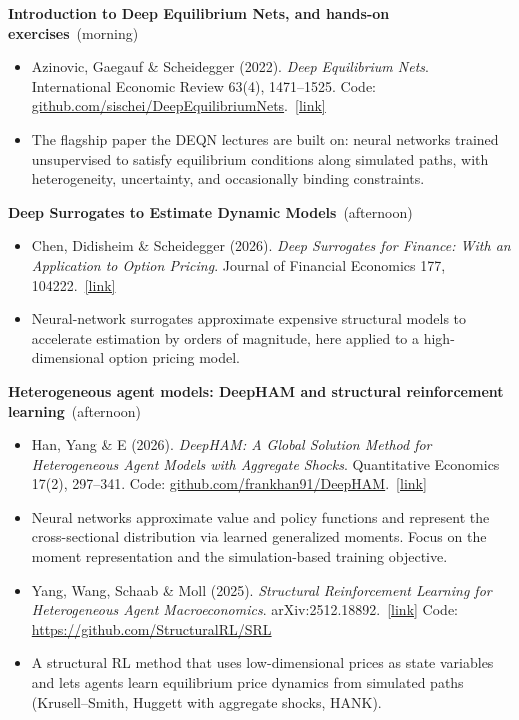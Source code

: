 \documentclass[11pt]{article}
\newcommand{\reading}[5]{%
  \item #1. \textit{#2}. #3.\ \href{#4}{[link]}%
}
\newcommand{\session}[2]{\smallskip\noindent\textbf{\color{accent}#1}\ {\small\color{notegray}(#2)}\par\nopagebreak\smallskip}
\begin{document}
\session{Introduction to Deep Equilibrium Nets, and hands-on exercises}{morning}

\begin{itemize}
  \reading{Azinovic, Gaegauf \& Scheidegger (2022)}{Deep Equilibrium Nets}{International Economic Review 63(4), 1471--1525. Code: \href{https://github.com/sischei/DeepEquilibriumNets}{github.com/\allowbreak sischei/\allowbreak DeepEquilibriumNets}}{https://doi.org/10.1111/iere.12575}{}
  \item[] {\small\color{notegray}The flagship paper the DEQN lectures are built on: neural networks trained unsupervised to satisfy equilibrium conditions along simulated paths, with heterogeneity, uncertainty, and occasionally binding constraints.}
\end{itemize}

\session{Deep Surrogates to Estimate Dynamic Models}{afternoon}

\begin{itemize}
  \reading{Chen, Didisheim \& Scheidegger (2026)}{Deep Surrogates for Finance: With an Application to Option Pricing}{Journal of Financial Economics 177, 104222}{https://doi.org/10.1016/j.jfineco.2025.104222}{}
  \item[] {\small\color{notegray}Neural-network surrogates approximate expensive structural models to accelerate estimation by orders of magnitude, here applied to a high-dimensional option pricing model.}
\end{itemize}

\session{Heterogeneous agent models: DeepHAM and structural reinforcement learning}{afternoon}

\begin{itemize}
  \reading{Han, Yang \& E (2026)}{DeepHAM: A Global Solution Method for Heterogeneous Agent Models with Aggregate Shocks}{Quantitative Economics 17(2), 297--341. Code: \href{https://github.com/frankhan91/DeepHAM}{github.com/\allowbreak frankhan91/\allowbreak DeepHAM}}{https://doi.org/10.3982/QE2190}{}
  \item[] {\small\color{notegray}Neural networks approximate value and policy functions and represent the cross-sectional distribution via learned generalized moments. Focus on the moment representation and the simulation-based training objective.}
    \reading{Yang, Wang, Schaab \& Moll (2025)}{Structural Reinforcement Learning for Heterogeneous Agent Macroeconomics}{arXiv:2512.18892}{https://benjaminmoll.com/SRL/}{} Code: \href{https://github.com/StructuralRL/SRL}{https://github.com/StructuralRL/SRL}
  \item[] {\small\color{notegray}A structural RL method that uses low-dimensional prices as state variables and lets agents learn equilibrium price dynamics from simulated paths (Krusell--Smith, Huggett with aggregate shocks, HANK).}
\end{itemize}
\end{document}
